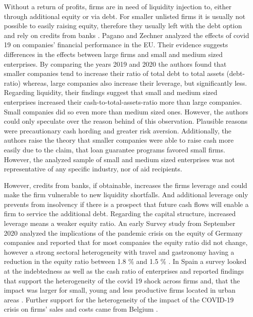 Without a return of profits, firms are in need of liquidity injection to, either through additional equity or via debt. For smaller unlisted firms it is usually not possible to easily raising equity, therefore they usually left with the debt option and rely on credits from banks \parencite{pagano_covid-19_2022}. Pagano and Zechner \parencite*{pagano_covid-19_2022} analyzed the effects of covid 19 on companies’ financial performance in the EU. Their evidence suggests differences in the effects between large firms and small and medium sized enterprises. By comparing the years 2019 and 2020 the authors found that smaller companies tend to increase their ratio of total debt to total assets (debt-ratio) whereas, large companies also increase their leverage, but significantly less. Regarding liquidity, their findings suggest that small and medium sized enterprises increased their cash-to-total-assets-ratio more than large companies. Small companies did so even more than medium sized ones. However, the authors could only speculate over the reason behind of this observation. Plausible reasons were precautionary cash hording and greater risk aversion. Additionally, the authors raise the theory that smaller companies were able to raise cash more easily due to the claim, that loan guarantee programs favored small firms. However, the analyzed sample of small and medium sized enterprises was not representative of any specific industry, nor of aid recipients.

However, credits from banks, if obtainable, increases the firms leverage and could make the firm vulnerable to new liquidity shortfalls. And additional leverage only prevents from insolvency if there is a prospect that future cash flows will enable a firm to service the additional debt. Regarding the capital structure, increased leverage means a weaker equity ratio. An early Survey study from September 2020 analyzed the implications of the pandemic crisis on the equity of Germany companies and reported that for most companies the equity ratio did not change, however a strong sectoral heterogeneity with travel and gastronomy having a reduction in the equity ratio between 1.8 \% and 1.5 \% \parencite{peichl_eigenkapitalentwicklung_2021}. In Spain a survey looked at the indebtedness as well as the cash ratio of enterprises and reported findings that support the heterogeneity of the covid 19 shock across firms and, that the impact was larger for small, young and less productive firms located in urban areas \parencite{fernandez-cerezo_firm-level_2021}. Further support for the heterogeneity of the impact of the COVID-19 crisis on firms’ sales and costs came from Belgium \parencite{dhyne_belgian_2021}.

